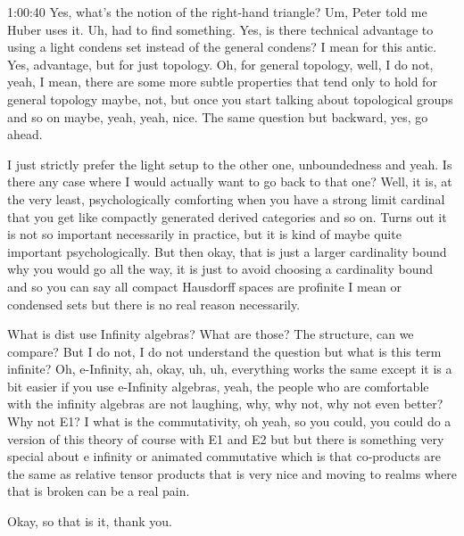 \begin{unfinished}{1:00:40}
Yes, what's the notion of the right-hand triangle? Um, Peter told me Huber uses it. Uh, had to find something. Yes, is there technical advantage to using a light condens set instead of the general condens? I mean for this antic. Yes, advantage, but for just topology. Oh, for general topology, well, I do not, yeah, I mean, there are some more subtle properties that tend only to hold for general topology maybe, not, but once you start talking about topological groups and so on maybe, yeah, yeah, nice. The same question but backward, yes, go ahead.

I just strictly prefer the light setup to the other one, unboundedness and yeah. Is there any case where I would actually want to go back to that one? Well, it is, at the very least, psychologically comforting when you have a strong limit cardinal that you get like compactly generated derived categories and so on. Turns out it is not so important necessarily in practice, but it is kind of maybe quite important psychologically. But then okay, that is  just a larger cardinality bound why you would go all the way, it is just to avoid choosing a cardinality bound and so you can say all compact Hausdorff spaces are profinite I mean or condensed sets but there is no real reason necessarily.

What is dist use Infinity algebras? What are those? The structure, can we compare? But I do not, I do not understand the question but what is this term infinite? Oh, e-Infinity, ah, okay, uh, uh, everything works the same except it is a bit easier if you use e-Infinity algebras, yeah, the people who are comfortable with the infinity algebras are not laughing, why, why not, why not even better? Why not E1? I what is the commutativity, oh yeah, so you could, you could do a version of this theory of course with E1 and E2 but but there is something very special about e infinity or animated commutative which is that co-products are the same as relative tensor products that is  very nice and moving to realms where that is  broken can be a real pain.

Okay, so that is  it, thank you.
\end{unfinished}